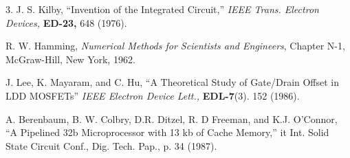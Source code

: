 \documentclass{wileySix}
\begin{document}






\begin{references}{3.}
J. S. Kilby,
``Invention of the Integrated Circuit,'' {\it IEEE Trans. Electron Devices,}
{\bf ED-23,} 648 (1976).

R. W. Hamming,
                 {\it Numerical Methods for Scientists and 
                 Engineers}, Chapter N-1, McGraw-Hill, 
                 New York, 1962.

J. Lee, K. Mayaram, and C. Hu, ``A Theoretical
               Study of Gate/Drain Offset in LDD MOSFETs''
                     {\it IEEE Electron Device Lett.,} {\bf EDL-7}(3). 152 
                     (1986).

A. Berenbaum, 
B. W. Colbry, D.R. Ditzel, R. D Freeman, and 
K.J. O'Connor, ``A Pipelined 32b Microprocessor with 13 kb of Cache Memory,''
{it Int. Solid State Circuit Conf., Dig. Tech. Pap.,} p. 34 (1987).
\end{references}
\end{document}
